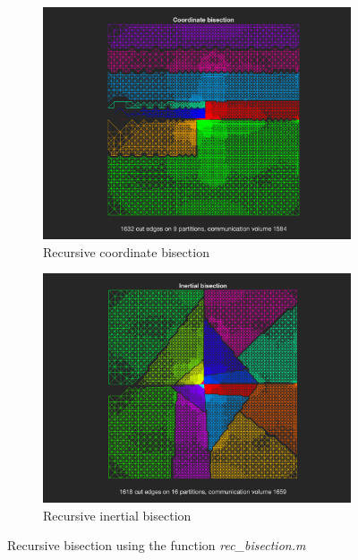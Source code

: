 \documentclass[unicode,11pt,a4paper,oneside,numbers=endperiod,openany]{scrartcl}
\begin{document}
\begin{figure}[h!]
\begin{subfigure}[b]{0.45\textwidth}
	\includegraphics[width=\textwidth]{images/coordinate_crack.png}
	\caption{Recursive coordinate bisection}
	\end{subfigure}
	\hfill
	\begin{subfigure}[b]{0.455\textwidth}
	\includegraphics[width=\textwidth]{images/inertial_crack.png}
	\caption{Recursive inertial bisection}
	\end{subfigure}
	\caption{Recursive bisection using the function \textit{rec\_bisection.m}}
	\label{fig:recbis}
\end{figure}
\end{document}
